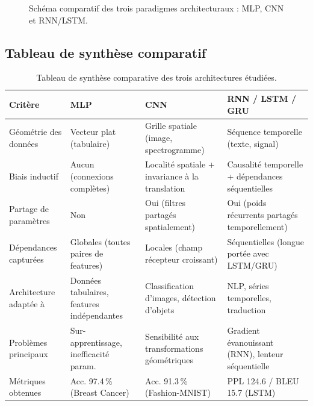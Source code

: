 \documentclass[11pt,a4paper]{article}
\begin{document}
\begin{figure}[H]
  \centering
  \caption{Schéma comparatif des trois paradigmes architecturaux : MLP, CNN et RNN/LSTM.}
  \label{fig:archi_diagram}
\end{figure}

\subsection{Tableau de synthèse comparatif}

\begin{table}[H]
  \centering
  \caption{Tableau de synthèse comparative des trois architectures étudiées.}
  \label{tab:synthese_finale}
  \begin{tabular}{p{3.2cm}p{4cm}p{4cm}p{4cm}}
    \toprule
    \textbf{Critère}
      & \textbf{MLP}
      & \textbf{CNN}
      & \textbf{RNN / LSTM / GRU} \\
    \midrule
    Géométrie des données
      & Vecteur plat (tabulaire)
      & Grille spatiale (image, spectrogramme)
      & Séquence temporelle (texte, signal) \\[0.5em]
    Biais inductif
      & Aucun (connexions complètes)
      & Localité spatiale + invariance à la translation
      & Causalité temporelle + dépendances séquentielles \\[0.5em]
    Partage de paramètres
      & Non
      & Oui (filtres partagés spatialement)
      & Oui (poids récurrents partagés temporellement) \\[0.5em]
    Dépendances capturées
      & Globales (toutes paires de features)
      & Locales (champ récepteur croissant)
      & Séquentielles (longue portée avec LSTM/GRU) \\[0.5em]
    Architecture adaptée à
      & Données tabulaires, features indépendantes
      & Classification d'images, détection d'objets
      & NLP, séries temporelles, traduction \\[0.5em]
    Problèmes principaux
      & Sur-apprentissage, inefficacité param.
      & Sensibilité aux transformations géométriques
      & Gradient évanouissant (RNN), lenteur séquentielle \\[0.5em]
    Métriques obtenues
      & Acc. 97.4\,\% (Breast Cancer)
      & Acc. 91.3\,\% (Fashion-MNIST)
      & PPL 124.6 / BLEU 15.7 (LSTM) \\
    \bottomrule
  \end{tabular}
\end{table}
\end{document}
